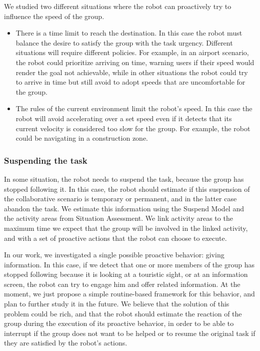 We studied two different situations where the robot can proactively try to influence the speed of the group.
\begin{itemize}
\item There is a time limit to reach the destination. In this case the robot must balance the desire to satisfy the group with the task urgency. Different situations will require different policies. For example, in an airport scenario, the robot could prioritize arriving on time, warning users if their speed would render the goal not achievable, while in other situations the robot could try to arrive in time but still avoid to adopt speeds that are uncomfortable for the group.
\item The rules of the current environment limit the robot's speed. In this case the robot will avoid accelerating over a set speed even if it detects that its current velocity is considered too slow for the group. For example, the robot could be navigating in a construction zone.
\end{itemize}

\subsubsection{Suspending the task}
In some situation, the robot needs to suspend the task, because the group has stopped following it. In this case, the robot should estimate if this suspension of the collaborative scenario is temporary or permanent, and in the latter case abandon the task. We estimate this information using the Suspend Model and the activity areas from Situation Assessment. We link activity areas to the maximum time we expect that the group will be involved in the linked activity, and with a set of proactive actions that the robot can choose to execute.

In our work, we investigated a single possible proactive behavior: giving information. In this case, if we detect that one or more  members
of the group has stopped following because it is looking at a touristic sight, or at an information screen, the robot can try to engage him and offer related information. At the moment, we just propose a simple routine-based framework for this behavior, and plan to further study it in the future. We believe that the solution of this problem could be rich, and that the robot should estimate the reaction of the group during the execution of its proactive behavior, in order to be able to interrupt if the group does not want to be helped or to resume the original task if they are satisfied by the robot's actions.

